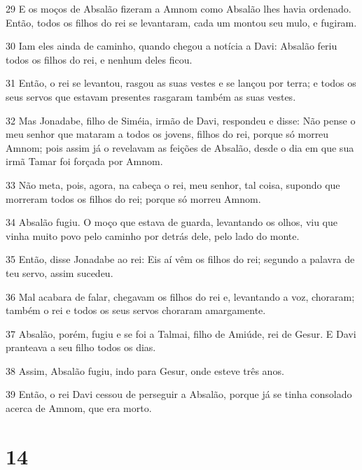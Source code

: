 \par 29 E os moços de Absalão fizeram a Amnom como Absalão lhes havia ordenado. Então, todos os filhos do rei se levantaram, cada um montou seu mulo, e fugiram.
\par 30 Iam eles ainda de caminho, quando chegou a notícia a Davi: Absalão feriu todos os filhos do rei, e nenhum deles ficou.
\par 31 Então, o rei se levantou, rasgou as suas vestes e se lançou por terra; e todos os seus servos que estavam presentes rasgaram também as suas vestes.
\par 32 Mas Jonadabe, filho de Siméia, irmão de Davi, respondeu e disse: Não pense o meu senhor que mataram a todos os jovens, filhos do rei, porque só morreu Amnom; pois assim já o revelavam as feições de Absalão, desde o dia em que sua irmã Tamar foi forçada por Amnom.
\par 33 Não meta, pois, agora, na cabeça o rei, meu senhor, tal coisa, supondo que morreram todos os filhos do rei; porque só morreu Amnom.
\par 34 Absalão fugiu. O moço que estava de guarda, levantando os olhos, viu que vinha muito povo pelo caminho por detrás dele, pelo lado do monte.
\par 35 Então, disse Jonadabe ao rei: Eis aí vêm os filhos do rei; segundo a palavra de teu servo, assim sucedeu.
\par 36 Mal acabara de falar, chegavam os filhos do rei e, levantando a voz, choraram; também o rei e todos os seus servos choraram amargamente.
\par 37 Absalão, porém, fugiu e se foi a Talmai, filho de Amiúde, rei de Gesur. E Davi pranteava a seu filho todos os dias.
\par 38 Assim, Absalão fugiu, indo para Gesur, onde esteve três anos.
\par 39 Então, o rei Davi cessou de perseguir a Absalão, porque já se tinha consolado acerca de Amnom, que era morto.

\chapter{14}

